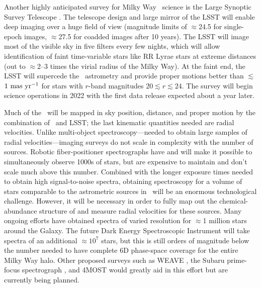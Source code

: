 Another highly anticipated survey for Milky Way \mwhalo\ science is the Large
Synoptic Survey Telescope \citep[LSST;][]{lsstsciencebook}. The telescope design
and large mirror of the LSST will enable deep imaging over a huge field of view
(magnitude limits of $\approx$24.5 for single-epoch images, $\approx$27.5 for
coadded images after 10 years). The LSST will image most of the visible sky in
five filters every few nights, which will allow identification of faint
time-variable stars like RR Lyrae stars at extreme distances (out to
$\approx$2--3 times the virial radius of the Milky Way). At the faint end, the
LSST will supercede the \gaia\ astrometry and provide proper motions better than
$\lesssim$$1~{\rm mas}~{\rm yr}^{-1}$ for stars with $r$-band magnitudes $20
\lesssim r \lesssim 24$. The survey will begin science operations in 2022 with
the first data release expected about a year later.

Much of the \mwhalo\ will be mapped in sky position, distance, and proper motion
by the combination of \gaia\ and LSST; the last kinematic quantities needed are
radial velocities. Unlike multi-object spectroscopy---needed to obtain large
samples of radial velocities---imaging surveys do not scale in complexity with
the number of sources. Robotic fiber-positioner spectrographs
\citep{saunders12} have and will make it possible to simultaneously observe
1000s of stars, but are expensive to maintain and don't scale much above this
number. Combined with the longer exposure times needed to obtain high
signal-to-noise spectra, obtaining spectroscopy for a volume of stars comparable
to the astrometric sources in \gaia\ will be an enormous technological
challenge. However, it will be necessary in order to fully map out the
chemical-abundance structure of and measure radial velocities for these sources.
Many ongoing efforts \citep[e.g.,][]{rave06, segue08, apogee15, galah15} have
obtained spectra of varied resolution for $\approx$1 million stars around the
Galaxy. The future Dark Energy Spectroscopic Instrument
\citep[DESI;][]{desi-whitepaper} will take spectra of an additional
$\approx$$10^7$ stars, but this is still orders of magnitude below the number
needed to have complete 6D phase-space coverage for the entire Milky Way halo.
Other proposed  surveys such as WEAVE \citep{weave12}, the Subaru prime-focus
spectrograph \citep[PFS;][]{subarupfs15}, and 4MOST \citep{4most12} would
greatly aid in this effort but are currently being planned.


